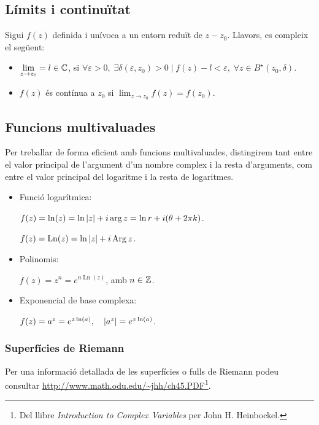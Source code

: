 \subsection{Límits i continuïtat}
Sigui $f(z)$ definida i unívoca a un entorn reduït de $z-z_{0}$. Llavors, es compleix el següent:
\begin{itemize}
    \item $\displaystyle \lim_{z \to z_{0}} = l \in \mathbb{C}$, si $\forall \varepsilon > 0, \; \exists \delta(\varepsilon, z_{0}) > 0 \mid f(z) - l < \varepsilon, \; \forall z \in B^{\star}(z_{0}, \delta)$.
    \item $f(z)$ és contínua a $z_{0}$ si $\lim_{z \to z_{0}} f(z) = f(z_{0})$.
\end{itemize}

\subsection{Funcions multivaluades}
Per treballar de forma eficient amb funcions multivaluades, distingirem tant entre el valor principal de l'argument d'un nombre complex i la resta d'arguments, com entre el valor principal del logaritme i la resta de logaritmes.
\begin{itemize}
    \item Funció logarítmica:
    
    $f(z) = \ln (z) = \ln \left| z \right| + i \operatorname{arg} z = \ln r + i(\theta + 2\pi k)$.
    
    $f(z) = \operatorname{Ln} (z) = \ln \left| z \right| + i \operatorname{Arg} z$.
    \item Polinomis:
    
    $f(z) = z^{n} = e^{n \operatorname{Ln} (z)}$, amb $n \in \mathbb{Z}$.
    \item Exponencial de base complexa:
    
    $f(z) = a^{z} = e^{z \ln (a)}, \quad \left| a^{z} \right| = e^{x \ln (a)}$.
\end{itemize}

\subsubsection*{Superfícies de Riemann}
Per una informació detallada de les superfícies o fulls de Riemann podeu consultar  \url{http://www.math.odu.edu/~jhh/ch45.PDF}\footnote{Del llibre \textit{Introduction to Complex Variables} per John H. Heinbockel.}.

